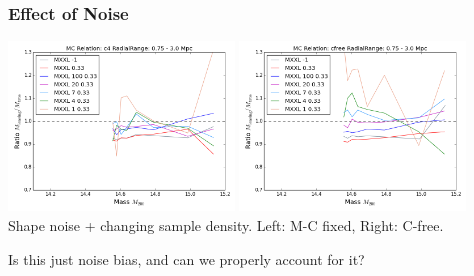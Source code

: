 \documentclass{beamer}
\begin{document}
\begin{frame}
\frametitle{Effect of Noise}
\centering

\includegraphics[width=0.45\textwidth]{../figures/density_noise2_c4-r10.png}
\includegraphics[width=0.45\textwidth]{../figures/density_noise2_cfree-r10}\\
{\tiny Shape noise + changing sample density. Left: M-C fixed, Right: C-free.}

{\small
Is this just noise bias, and can we properly account for it?
}

\end{frame}

\end{document}
